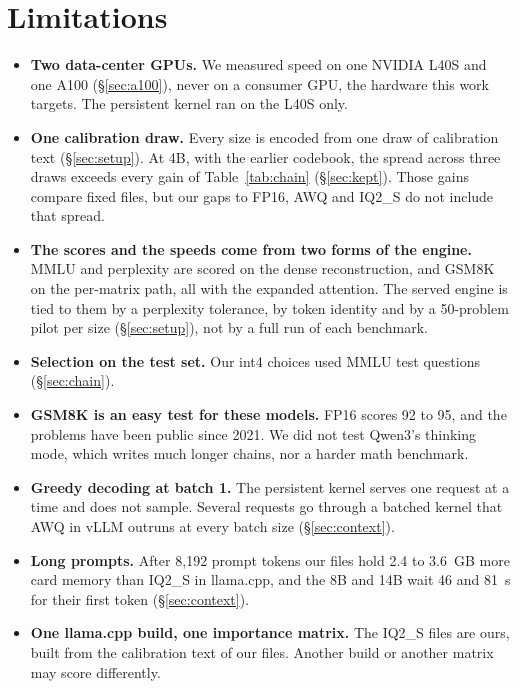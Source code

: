 \section{Limitations}
\label{sec:limitations}

\begin{itemize}
\item \textbf{Two data-center GPUs.} We measured speed on one NVIDIA L40S and
  one A100 (\S\ref{sec:a100}), never on a consumer GPU, the hardware this work
  targets. The persistent kernel ran on the L40S only.
\item \textbf{One calibration draw.} Every size is encoded from one draw of
  calibration text (\S\ref{sec:setup}). At 4B, with the earlier codebook, the
  spread across three draws exceeds every gain of Table~\ref{tab:chain}
  (\S\ref{sec:kept}). Those gains compare fixed files, but our gaps to FP16,
  AWQ and IQ2\_S do not include that spread.
\item \textbf{The scores and the speeds come from two forms of the engine.}
  MMLU and perplexity are scored on the dense reconstruction, and GSM8K on the
  per-matrix path, all with the expanded attention. The served engine is
  tied to them by a perplexity tolerance, by token identity and by a
  50-problem pilot per size (\S\ref{sec:setup}), not by a full run of each
  benchmark.
\item \textbf{Selection on the test set.} Our int4 choices used MMLU test
  questions (\S\ref{sec:chain}).
\item \textbf{GSM8K is an easy test for these models.} FP16 scores 92 to 95,
  and the problems have been public since 2021. We did not test Qwen3's
  thinking mode, which writes much longer chains, nor a harder math
  benchmark.
\item \textbf{Greedy decoding at batch 1.} The persistent kernel serves one
  request at a time and does not sample. Several requests go through a
  batched kernel that AWQ in vLLM outruns at every batch size
  (\S\ref{sec:context}).
\item \textbf{Long prompts.} After 8{,}192 prompt tokens our files hold 2.4 to
  3.6~GB more card memory than IQ2\_S in llama.cpp, and the 8B and 14B wait
  46 and 81~s for their first token (\S\ref{sec:context}).
\item \textbf{One llama.cpp build, one importance matrix.} The IQ2\_S files
  are ours, built from the calibration text of our files. Another build or
  another matrix may score differently.
\end{itemize}
